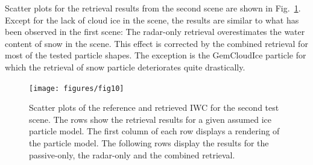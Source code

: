 \documentclass[journal abbreviation, manuscript]{copernicus}
\begin{document}
Scatter plots for the retrieval results from the second scene are shown in
Fig.~\ref{fig:results_scatter_b_1}. Except for the lack of cloud ice in the
scene, the results are similar to what has been observed in the first scene: The
radar-only retrieval overestimates the water content of snow in the scene. This
effect is corrected by the combined retrieval for most of the tested particle
shapes. The exception is the GemCloudIce particle for which the retrieval of
snow particle deteriorates quite drastically.

\begin{figure}[!h]
\centering
\texttt{[image: figures/fig10]}
\caption{Scatter plots of the reference and retrieved IWC for
  the second test scene. The rows show the retrieval results for a given
  assumed ice particle model. The first column of each row displays a rendering
  of the particle model. The following rows display the results for the
  passive-only, the radar-only and the combined retrieval.}
\label{fig:results_scatter_b_1}
\end{figure}


\appendixfigures  %

\appendixtables   %


\noappendix





\end{document}
